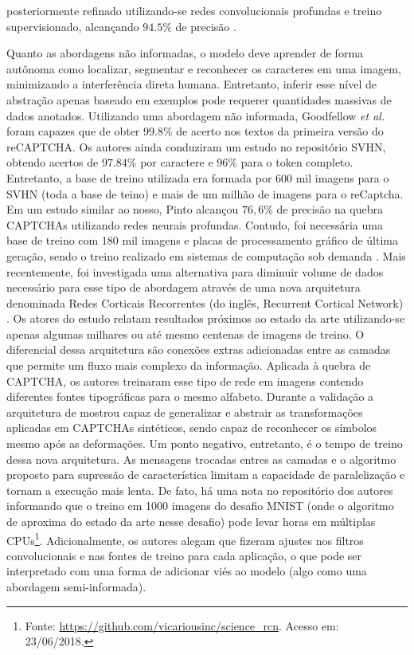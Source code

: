 posteriormente refinado utilizando-se redes convolucionais profundas e treino supervisionado, alcançando $94.5\%$ de precisão \cite{sermanet2012convolutional}.

Quanto as abordagens não informadas, o modelo deve aprender de forma autônoma como localizar, segmentar e reconhecer os caracteres em uma imagem, minimizando a interferência direta humana. Entretanto, inferir esse nível de abstração apenas baseado em exemplos pode requerer quantidades massivas de dados anotados. Utilizando uma abordagem não informada, Goodfellow \textit{et al.} foram capazes que \cite{captcha_break_2013} de obter $99.8\%$ de acerto nos textos da primeira versão do reCAPTCHA. Os autores ainda conduziram um estudo no repositório SVHN, obtendo acertos de $97.84\%$ por caractere e $96\%$ para o token completo. Entretanto, a base de treino utilizada era formada por 600 mil imagens para o SVHN (toda a base de teino) e mais de um milhão de imagens para o reCaptcha. Em um estudo similar ao nosso, Pinto alcançou $76,6\%$ de precisão na quebra CAPTCHAs utilizando redes neurais profundas. Contudo, foi necessária uma base de treino com 180 mil imagens e placas de processamento gráfico de última geração, sendo o treino realizado em sistemas de computação sob demanda \cite{otaro}. Mais recentemente, foi investigada uma alternativa para diminuir volume de dados necessário para esse tipo de abordagem através de uma nova arquitetura denominada Redes Corticais Recorrentes (do inglês, Recurrent Cortical Network) \cite{captcha_break_2017}. Os atores do estudo relatam resultados próximos ao estado da arte utilizando-se apenas algumas milhares ou até mesmo centenas de imagens de treino. O diferencial dessa arquitetura são conexões extras adicionadas entre as camadas que permite um fluxo mais complexo da informação. Aplicada à quebra de CAPTCHA, os autores treinaram esse tipo de rede em imagens contendo diferentes fontes tipográficas para o mesmo alfabeto. Durante a validação a arquitetura de mostrou capaz de generalizar e abstrair as transformações aplicadas em CAPTCHAs sintéticos, sendo capaz de reconhecer os símbolos mesmo após as deformações. Um ponto negativo, entretanto, é o tempo de treino dessa nova arquitetura. As mensagens trocadas entres as camadas e o algoritmo proposto para supressão de característica limitam a capacidade de paralelização e tornam a execução mais lenta. De fato, há uma nota no repositório dos autores informando que o treino em 1000 imagens do desafio MNIST (onde o algoritmo de aproxima do estado da arte nesse desafio) pode levar horas em múltiplas CPUs\footnote{Fonte: \url{https://github.com/vicariousinc/science_rcn}. Acesso em: 23/06/2018.}. Adicionalmente, os autores alegam que fizeram ajustes nos filtros convolucionais e nas fontes de treino para cada aplicação, o que pode ser interpretado com uma forma de adicionar viés ao modelo (algo como uma abordagem semi-informada).  

